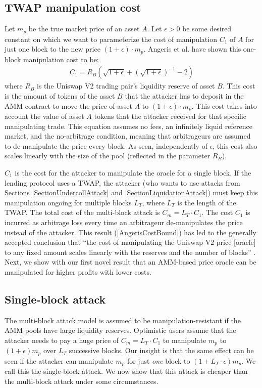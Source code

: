 \subsection{TWAP manipulation cost}
Let $m_p$ be the true market price of an asset $A$. Let $\epsilon > 0$ be some desired constant on which we want to parameterize the cost of manipulation $C_1$ of $A$ for just one block to the new price $(1+\epsilon)\cdot m_p$. Angeris et al. \cite{angeris2019uniswap} have shown this one-block manipulation cost to be:
\begin{align}
    C_1 = R_B(\sqrt{1+\epsilon} + (\sqrt{1+\epsilon})^{-1} -2)
    \label{AngerisCostBound}
\end{align}
where $R_B$ is the Uniswap V2 trading pair's liquidity reserve of asset $B$. This cost is the amount of tokens of the asset $B$ that the attacker has to deposit in the AMM contract to move the price of asset $A$ to $(1+\epsilon)\cdot m_p$. This cost takes into account the value of asset $A$ tokens that the attacker received for that specific manipulating trade. This equation assumes no fees, an infinitely liquid reference market, and the no-arbitrage condition, meaning that arbitrageurs are assumed to de-manipulate the price every block. As seen, independently of $\epsilon$, this cost also scales linearly with the size of the pool (reflected in the parameter $R_B$).

$C_1$ is the cost for the attacker to manipulate the oracle for a single block. If the lending protocol uses a TWAP, the attacker (who wants to use attacks from Sections \ref{SectionUndercollAttack} and \ref{SectionLiquidationAttack}) must keep this manipulation ongoing for multiple blocks $L_T$, where $L_T$ is the length of the TWAP. The total cost of the multi-block attack is $C_m = L_T \cdot C_1$. The cost $C_1$ is incurred as arbitrage loss every time an arbitrageur de-manipulates the price instead of the attacker. This result (\ref{AngerisCostBound}) has led to the generally accepted conclusion that ``the cost of manipulating the Uniswap V2 price [oracle] to any fixed amount scales linearly with the reserves and the number of blocks'' \cite{AngerisMedium}. Next, we show with our first novel result that an AMM-based price oracle can be manipulated for higher profits with lower costs.

\subsection{Single-block attack}
The multi-block attack model is assumed to be manipulation-resistant if the AMM pools have large liquidity reserves. Optimistic users assume that the attacker needs to pay a huge price of $C_m = L_T \cdot C_1$ to manipulate $m_p$ to $(1+\epsilon)m_p$ over $L_T$ successive blocks. Our insight is that the same effect can be seen if the attacker can manipulate $m_p$ for just \textit{one} block to $(1 + L_T \cdot \epsilon) m_p$. We call this the single-block attack. We now show that this attack is cheaper than the multi-block attack under some circumstances.

